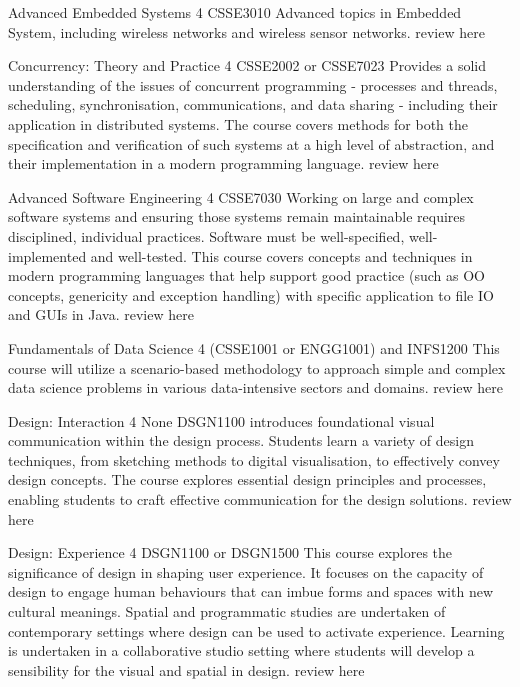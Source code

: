 	{Advanced Embedded Systems}
	{4}
	{CSSE3010}
	{}
	{}
	{Advanced topics in Embedded System, including wireless networks and wireless sensor networks.}
	{review here}

	{Concurrency: Theory and Practice}
	{4}
	{CSSE2002 or CSSE7023}
	{}
	{}
	{Provides a solid understanding of the issues of concurrent programming - processes and threads, scheduling, synchronisation, communications, and data sharing - including their application in distributed systems. The course covers methods for both the specification and verification of such systems at a high level of abstraction, and their implementation in a modern programming language.}
	{review here}

	{Advanced Software Engineering}
	{4}
	{CSSE7030}
	{}
	{}
	{Working on large and complex software systems and ensuring those systems remain maintainable requires disciplined, individual practices. Software must be well-specified, well-implemented and well-tested. This course covers concepts and techniques in modern programming languages that help support good practice (such as OO concepts, genericity and exception handling) with specific application to file IO and GUIs in Java.}
	{review here}

	{Fundamentals of Data Science}
	{4}
	{(CSSE1001 or ENGG1001) and INFS1200}
	{}
	{}
	{This course will utilize a scenario-based methodology to approach simple and complex data science problems in various data-intensive sectors and domains.}
	{review here}

	{Design: Interaction}
	{4}
	{None}
	{}
	{}
	{DSGN1100 introduces foundational visual communication within the design process. Students learn a variety of design techniques, from sketching methods to digital visualisation, to effectively convey design concepts. The course explores essential design principles and processes, enabling students to craft effective communication for the design solutions.}
	{review here}

	{Design: Experience}
	{4}
	{DSGN1100 or DSGN1500}
	{}
	{}
	{This course explores the significance of design in shaping user experience. It focuses on the capacity of design to engage human behaviours that can imbue forms and spaces with new cultural meanings. Spatial and programmatic studies are undertaken of contemporary settings where design can be used to activate experience. Learning is undertaken in a collaborative studio setting where students will develop a sensibility for the visual and spatial in design.}
	{review here}

